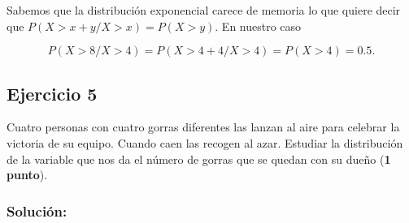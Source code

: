 \documentclass[
]{article}
\newenvironment{Shaded}{\begin{snugshade}}{\end{snugshade}}
\newcommand{\ControlFlowTok}[1]{\textcolor[rgb]{0.13,0.29,0.53}{\textbf{#1}}}
\newcommand{\DataTypeTok}[1]{\textcolor[rgb]{0.13,0.29,0.53}{#1}}
\newcommand{\DecValTok}[1]{\textcolor[rgb]{0.00,0.00,0.81}{#1}}
\newcommand{\KeywordTok}[1]{\textcolor[rgb]{0.13,0.29,0.53}{\textbf{#1}}}
\newcommand{\NormalTok}[1]{#1}
\newcommand{\OperatorTok}[1]{\textcolor[rgb]{0.81,0.36,0.00}{\textbf{#1}}}
\newcommand{\OtherTok}[1]{\textcolor[rgb]{0.56,0.35,0.01}{#1}}
\newcommand{\StringTok}[1]{\textcolor[rgb]{0.31,0.60,0.02}{#1}}
\begin{document}
Sabemos que la distribución exponencial carece de memoria lo que quiere
decir que \(P(X> x+y/X>x)=P(X> y)\). En nuestro caso

\[P(X>8/X>4)=P(X> 4+4/X>4)=P(X>4)=0.5.\]

\hypertarget{ejercicio-5}{%
\subsection{Ejercicio 5}\label{ejercicio-5}}

Cuatro personas con cuatro gorras diferentes las lanzan al aire para
celebrar la victoria de su equipo. Cuando caen las recogen al azar.
Estudiar la distribución de la variable que nos da el número de gorras
que se quedan con su dueño (\textbf{1 punto}).

\hypertarget{soluciuxf3n-4}{%
\subsubsection{Solución:}\label{soluciuxf3n-4}}

\begin{Shaded}
\end{Shaded}
\end{document}
